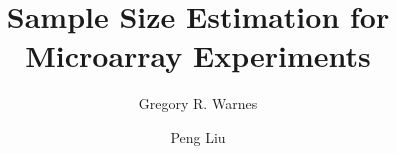 \documentclass[12pt]{article}
\begin{document}
\doublespace

\title{Sample Size Estimation for Microarray Experiments}
\author{Gregory R. Warnes}
\address{
    Department of Biostatistics and Computational Biology \\
    Univeristy of Rochester \\
    Rochester, NY 14620
}


\author{Peng Liu}
\address{
  Department of Biological Statistics and Computational Biology\\
  Cornell University\\
  Ithaca, NY 14853
  }

\maketitle
\end{document}
